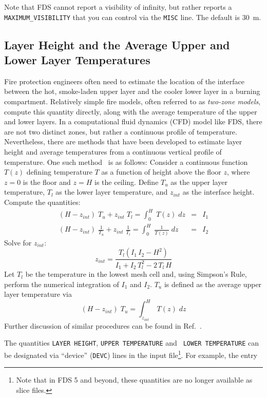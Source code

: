 \documentclass[11pt]{book}
\newcommand{\ct}{\tt\small}
\newcommand{\be}{\begin{equation}}
\newcommand{\ee}{\end{equation}}
\begin{document}
Note that FDS cannot report a visibility of infinity, but rather reports a {\ct MAXIMUM\_VISIBILITY} that you can control via the
{\ct MISC} line. The default is 30~m.


\subsection{Layer Height and the Average Upper and Lower Layer Temperatures}
\label{info:layerheight}

Fire protection engineers often need to estimate the location of the
interface between the hot, smoke-laden upper layer and the cooler
lower layer in a burning compartment.  Relatively simple fire models,
often referred to as {\em two-zone models}, compute this quantity
directly, along with the average temperature of the upper and lower
layers.  In a computational fluid dynamics (CFD) model like FDS, there
are not two distinct zones, but rather a continuous profile of
temperature. Nevertheless, there are methods that have been developed
to estimate layer height and average temperatures from a continuous
vertical profile of temperature. One such
method~\cite{Janssens:JFS1992} is as follows: Consider a continuous
function $T(z)$ defining temperature $T$ as a function of height above
the floor $z$, where $z=0$ is the floor and $z=H$ is the
ceiling. Define $T_u$ as the upper layer temperature, $T_l$ as the
lower layer temperature, and $z_{int}$ as the interface
height. Compute the quantities:
\begin{eqnarray*} (H-z_{int})\; T_u + z_{int} \; T_l = \int_0^H \; T(z) \; dz &=& I_1 \\
                  (H-z_{int})\; \frac{1}{T_u} + z_{int} \; \frac{1}{T_l} = \int_0^H \; \frac{1}{T(z)} \; dz &=& I_2 \end{eqnarray*}
Solve for $z_{int}$:
\be z_{int} = \frac{ T_l(I_1 \, I_2 - H^2)}{I_1+I_2 \, T_l^2 - 2\, T_l \, H} \ee
Let $T_l$ be the temperature in the lowest mesh cell and, using
Simpson's Rule, perform the numerical integration of $I_1$ and
$I_2$. $T_u$ is defined as the average upper layer temperature via
\be (H-z_{int})\; T_u = \int_{z_{int}}^H \; T(z) \; dz \ee
Further discussion of similar procedures can be found in Ref.~\cite{He:1}.

The quantities {\ct LAYER HEIGHT}, {\ct UPPER TEMPERATURE} and {\ct
LOWER TEMPERATURE} can be designated via ``device'' ({\ct DEVC}) lines
in the input file\footnote{Note that in FDS 5 and beyond, these
quantities are no longer available as slice files.}. For example, the
entry
\end{document}
